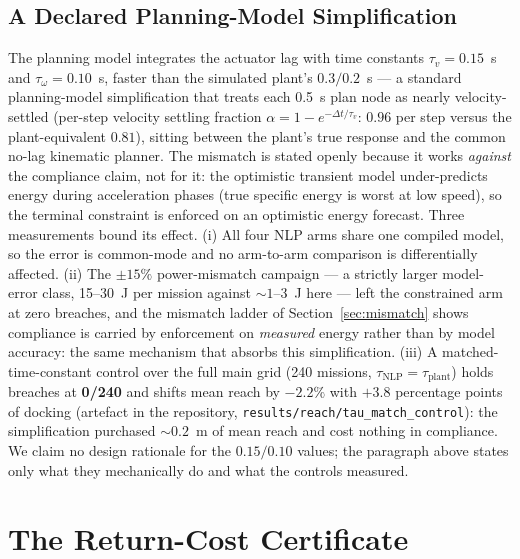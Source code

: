 \documentclass[preprint,12pt]{elsarticle}
\begin{document}
\subsection{A Declared Planning-Model Simplification}
\label{sec:taudeclaration}
The planning model integrates the actuator lag with time constants
$\tau_v = 0.15$~s and $\tau_\omega = 0.10$~s, faster than the
simulated plant's $0.3/0.2$~s --- a standard planning-model
simplification that treats each 0.5~s plan node as nearly
velocity-settled (per-step velocity settling fraction
$\alpha = 1 - e^{-\Delta t/\tau_v}$: $0.96$ per step versus the
plant-equivalent $0.81$), sitting between the plant's true response
and the common no-lag kinematic planner.
The mismatch is stated
openly because it works \emph{against} the compliance claim, not for
it: the optimistic transient model under-predicts energy during
acceleration phases (true specific energy is worst at low speed), so
the terminal constraint is enforced on an optimistic energy forecast.
Three measurements bound its effect. (i) All four NLP arms share one
compiled model, so the error is common-mode and no arm-to-arm
comparison is differentially affected. (ii) The $\pm 15\%$
power-mismatch campaign --- a strictly larger model-error class,
15--30~J per mission against ${\sim}1$--3~J here --- left the
constrained arm at zero breaches, and the mismatch ladder of
Section~\ref{sec:mismatch} shows compliance is carried by enforcement
on \emph{measured} energy rather than by model accuracy: the same
mechanism that absorbs this simplification. (iii) A
matched-time-constant control over the full main grid (240 missions,
$\tau_{\mathrm{NLP}} = \tau_{\mathrm{plant}}$) holds breaches at
\textbf{0/240} and shifts mean reach by $-2.2\%$ with $+3.8$
percentage points of docking
(artefact in the repository, \texttt{results/reach/tau\_match\_control}):
the simplification purchased ${\sim}0.2$~m of mean reach and cost
nothing in compliance. We claim no design rationale for the
$0.15/0.10$ values; the paragraph above states only what they
mechanically do and what the controls measured.

\section{The Return-Cost Certificate}
\label{sec:certificate}
\end{document}

